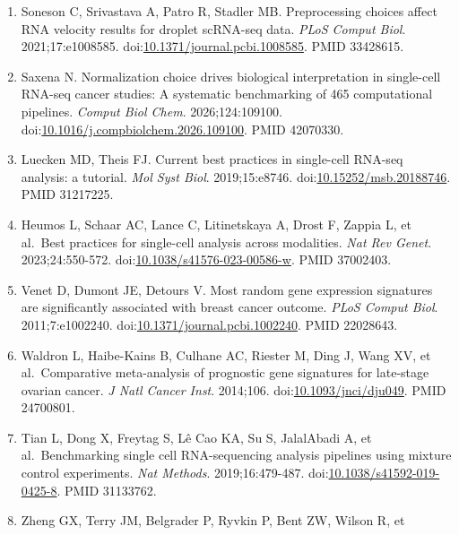 \documentclass[11pt]{article}
\begin{document}
\begin{enumerate}
  the evaluation of computational pipelines, reveals performant single
  cell RNA-seq preprocessing tools. \emph{Genome Biol}. 2020;21:227.
  doi:\href{https://doi.org/10.1186/s13059-020-02136-7}{10.1186/s13059-020-02136-7}.
  PMID 32873325.
\item
  Soneson C, Srivastava A, Patro R, Stadler MB. Preprocessing choices
  affect RNA velocity results for droplet scRNA-seq data. \emph{PLoS
  Comput Biol}. 2021;17:e1008585.
  doi:\href{https://doi.org/10.1371/journal.pcbi.1008585}{10.1371/journal.pcbi.1008585}.
  PMID 33428615.
\item
  Saxena N. Normalization choice drives biological interpretation in
  single-cell RNA-seq cancer studies: A systematic benchmarking of 465
  computational pipelines. \emph{Comput Biol Chem}. 2026;124:109100.
  doi:\href{https://doi.org/10.1016/j.compbiolchem.2026.109100}{10.1016/j.compbiolchem.2026.109100}.
  PMID 42070330.
\item
  Luecken MD, Theis FJ. Current best practices in single-cell RNA-seq
  analysis: a tutorial. \emph{Mol Syst Biol}. 2019;15:e8746.
  doi:\href{https://doi.org/10.15252/msb.20188746}{10.15252/msb.20188746}.
  PMID 31217225.
\item
  Heumos L, Schaar AC, Lance C, Litinetskaya A, Drost F, Zappia L, et
  al.~Best practices for single-cell analysis across modalities.
  \emph{Nat Rev Genet}. 2023;24:550-572.
  doi:\href{https://doi.org/10.1038/s41576-023-00586-w}{10.1038/s41576-023-00586-w}.
  PMID 37002403.
\item
  Venet D, Dumont JE, Detours V. Most random gene expression signatures
  are significantly associated with breast cancer outcome. \emph{PLoS
  Comput Biol}. 2011;7:e1002240.
  doi:\href{https://doi.org/10.1371/journal.pcbi.1002240}{10.1371/journal.pcbi.1002240}.
  PMID 22028643.
\item
  Waldron L, Haibe-Kains B, Culhane AC, Riester M, Ding J, Wang XV, et
  al.~Comparative meta-analysis of prognostic gene signatures for
  late-stage ovarian cancer. \emph{J Natl Cancer Inst}. 2014;106.
  doi:\href{https://doi.org/10.1093/jnci/dju049}{10.1093/jnci/dju049}.
  PMID 24700801.
\item
  Tian L, Dong X, Freytag S, Lê Cao KA, Su S, JalalAbadi A, et
  al.~Benchmarking single cell RNA-sequencing analysis pipelines using
  mixture control experiments. \emph{Nat Methods}. 2019;16:479-487.
  doi:\href{https://doi.org/10.1038/s41592-019-0425-8}{10.1038/s41592-019-0425-8}.
  PMID 31133762.
\item
  Zheng GX, Terry JM, Belgrader P, Ryvkin P, Bent ZW, Wilson R, et

\end{enumerate}
\end{document}
